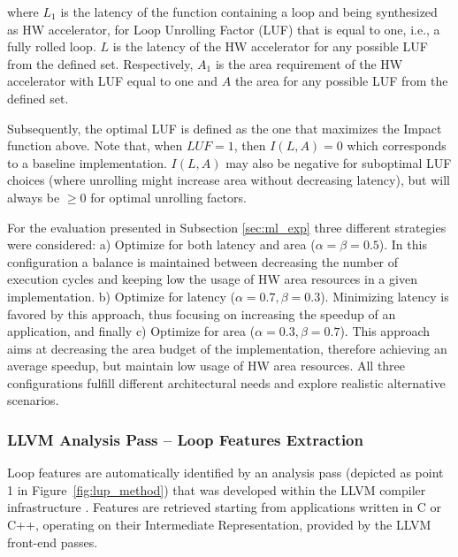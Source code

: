\documentclass[]{usiinfthesis}
\begin{document}
where $L_1$ is the latency of the function containing a loop and being synthesized as HW 
accelerator, for Loop Unrolling Factor (LUF) that is equal to one, i.e., a fully rolled loop. $L$ 
is the latency of the HW accelerator for any possible LUF from the defined set.
Respectively, $A_1$ is the area requirement of the HW accelerator with LUF equal to one and 
$A$ the area for any possible LUF from the defined set.\par

Subsequently, the optimal LUF is defined as the one that maximizes the Impact function above. Note that, 
when $LUF = 1$, then $I(L,A)=0$ which corresponds to a baseline implementation. $I(L,A)$ may also 
be negative for suboptimal LUF choices (where unrolling might increase area without decreasing 
latency), but will always be $\ge 0$ for optimal unrolling factors.\par


For the evaluation presented in Subsection \ref{sec:ml_exp}
three different strategies were considered: a) Optimize for both latency and area ($\alpha = 
\beta = 0.5$). In this configuration a balance is maintained between decreasing the number of 
execution cycles and keeping low the usage of HW area resources in a given implementation.
b) Optimize for latency ($\alpha = 0.7, \beta = 0.3$). Minimizing latency is favored by this
approach, thus focusing on increasing the speedup of an application, and finally c) Optimize
for area ($\alpha = 0.3, \beta = 0.7$). This approach aims at decreasing the area budget of 
the implementation, therefore achieving an average speedup, but maintain low usage of HW 
area resources. All three configurations fulfill different architectural needs and explore 
realistic alternative scenarios.\par



\subsubsection{LLVM Analysis Pass -- Loop Features Extraction}

Loop features are automatically identified by an analysis pass (depicted as 
point 1 in Figure~\ref{fig:lup_method}) that was developed within the LLVM 
compiler infrastructure \cite{LattnerMar04}. Features are retrieved starting from
applications written in C or C++, operating on their Intermediate
Representation, provided by the LLVM front-end passes.\par  
\end{document}
